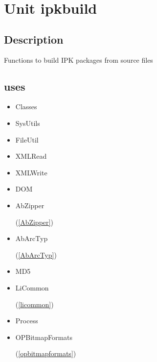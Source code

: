 \documentclass{report}
\begin{document}
\chapter{Unit ipkbuild}
\label{ipkbuild}
\section{Description}
Functions to build IPK packages from source files
\section{uses}
\begin{itemize}
\item \begin{ttfamily}Classes\end{ttfamily}\item \begin{ttfamily}SysUtils\end{ttfamily}\item \begin{ttfamily}FileUtil\end{ttfamily}\item \begin{ttfamily}XMLRead\end{ttfamily}\item \begin{ttfamily}XMLWrite\end{ttfamily}\item \begin{ttfamily}DOM\end{ttfamily}\item \begin{ttfamily}AbZipper\end{ttfamily}(\ref{AbZipper})\item \begin{ttfamily}AbArcTyp\end{ttfamily}(\ref{AbArcTyp})\item \begin{ttfamily}MD5\end{ttfamily}\item \begin{ttfamily}LiCommon\end{ttfamily}(\ref{licommon})\item \begin{ttfamily}Process\end{ttfamily}\item \begin{ttfamily}OPBitmapFormats\end{ttfamily}(\ref{opbitmapformats})\end{itemize}
\end{document}
